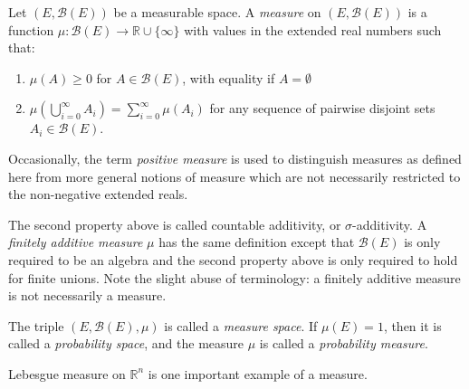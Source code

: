 \documentclass[12pt]{article}
\newcommand{\union}{\cup}
\begin{document}
Let $(E, \mathcal{B}(E))$ be a measurable space. A \emph{measure} on $(E,\mathcal{B}(E))$ is a function $\mu\colon \mathcal{B}(E) \to \mathbb{R} \union \{\infty\}$ with values in the extended real numbers such that:
\begin{enumerate}
\item $\mu(A) \geq 0$ for $A \in \mathcal{B}(E)$, with equality if $A = \emptyset$
\item $\mu(\bigcup_{i=0}^\infty A_i) = \sum_{i=0}^\infty \mu(A_i)$ for any sequence of pairwise disjoint sets $A_i \in \mathcal{B}(E)$.
\end{enumerate}

Occasionally, the term \emph{positive measure} is used to distinguish measures as defined here from more general notions of measure which are not necessarily restricted to the non-negative extended reals.

The second property above is called countable additivity, or $\sigma$-additivity.  A \emph{finitely additive measure} $\mu$ has the same definition except that $\mathcal{B}(E)$ is only required to be an algebra and the second property above is only required to hold for finite unions.  Note the slight abuse of terminology: a finitely additive measure is not necessarily a measure.

The triple $(E, \mathcal{B}(E), \mu)$ is called a \emph{measure space}. If $\mu(E) = 1$, then it is called a \emph{probability space}, and the measure $\mu$ is called a \emph{probability measure}.

Lebesgue measure on $\mathbb{R}^n$ is one important example of a measure.
\end{document}
